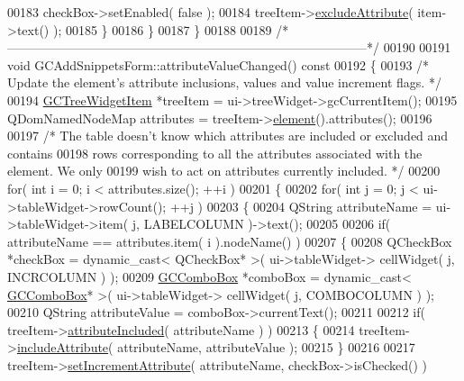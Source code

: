 \begin{DoxyCode}
00183       checkBox->setEnabled( \textcolor{keyword}{false} );
00184       treeItem->\hyperlink{class_g_c_tree_widget_item_a76e60292eec635fd2e6df27a3e162e16}{excludeAttribute}( item->text() );
00185     \}
00186   \}
00187 \}
00188 
00189 \textcolor{comment}{/*
      --------------------------------------------------------------------------------------*/}
00190 
00191 \textcolor{keywordtype}{void} GCAddSnippetsForm::attributeValueChanged()\textcolor{keyword}{ const}
00192 \textcolor{keyword}{}\{
00193   \textcolor{comment}{/* Update the element's attribute inclusions, values and value increment
       flags. */}
00194   \hyperlink{class_g_c_tree_widget_item}{GCTreeWidgetItem} *treeItem = ui->treeWidget->gcCurrentItem();
00195   QDomNamedNodeMap attributes = treeItem->\hyperlink{class_g_c_tree_widget_item_a584cad866bdbd94710d31eb77b804d84}{element}().attributes();
00196 
00197   \textcolor{comment}{/* The table doesn't know which attributes are included or excluded and
       contains}
00198 \textcolor{comment}{    rows corresponding to all the attributes associated with the element. We
       only}
00199 \textcolor{comment}{    wish to act on attributes currently included. */}
00200   \textcolor{keywordflow}{for}( \textcolor{keywordtype}{int} i = 0; i < attributes.size(); ++i )
00201   \{
00202     \textcolor{keywordflow}{for}( \textcolor{keywordtype}{int} j = 0; j < ui->tableWidget->rowCount(); ++j )
00203     \{
00204       QString attributeName = ui->tableWidget->item( j, LABELCOLUMN )->text();
00205 
00206       \textcolor{keywordflow}{if}( attributeName == attributes.item( i ).nodeName() )
00207       \{
00208         QCheckBox *checkBox = \textcolor{keyword}{dynamic\_cast<} QCheckBox* \textcolor{keyword}{>}( ui->tableWidget->
      cellWidget( j, INCRCOLUMN ) );
00209         \hyperlink{class_g_c_combo_box}{GCComboBox} *comboBox = \textcolor{keyword}{dynamic\_cast<} \hyperlink{class_g_c_combo_box}{GCComboBox}* \textcolor{keyword}{>}( ui->tableWidget->
      cellWidget( j, COMBOCOLUMN ) );
00210         QString attributeValue = comboBox->currentText();
00211 
00212         \textcolor{keywordflow}{if}( treeItem->\hyperlink{class_g_c_tree_widget_item_a91d71330acb400242d45b6d74c7e0f87}{attributeIncluded}( attributeName ) )
00213         \{
00214           treeItem->\hyperlink{class_g_c_tree_widget_item_a3f1c09758031e2a8fc1ac9336697b3d9}{includeAttribute}( attributeName, attributeValue );
00215         \}
00216 
00217         treeItem->\hyperlink{class_g_c_tree_widget_item_abf57de97998e38563dc9020cdf4d8340}{setIncrementAttribute}( attributeName, checkBox->isChecked() )

\end{DoxyCode}
